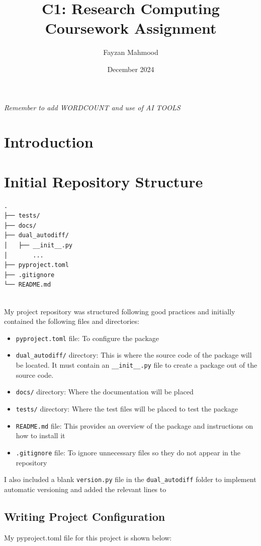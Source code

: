 \documentclass{article}
\title{C1: Research Computing Coursework Assignment}
\author{Fayzan Mahmood}
\date{December 2024}
\begin{document}
\maketitle
\textit{Remember to add WORDCOUNT and use of AI TOOLS}

\section*{Introduction}

\section{Initial Repository Structure}

\begin{verbatim}
.
├── tests/
├── docs/
├── dual_autodiff/
│   ├── __init__.py
│       ...
├── pyproject.toml
├── .gitignore 
└── README.md
        
\end{verbatim}  

My project repository was structured following good practices and initially contained the following files and directories:
\begin{itemize}
    \item \texttt{pyproject.toml} file: To configure the package
    \item \texttt{dual\_autodiff/} directory: This is where the source code of the package will be located. It must contain an \texttt{\_\_init\_\_.py} file to create a package out of the source code.
    \item \texttt{docs/} directory: Where the documentation will be placed
    \item \texttt{tests/} directory: Where the test files will be placed to test the package
    \item \texttt{README.md} file: This provides an overview of the package and instructions on how to install it
    \item \texttt{.gitignore} file: To ignore unnecessary files so they do not appear in the repository
\end{itemize}

I also included a blank \texttt{version.py} file in the \texttt{dual\_autodiff} folder to implement automatic versioning and added the relevant lines to

\subsection{Writing Project Configuration}
My pyproject.toml file for this project is shown below:

\end{document}
